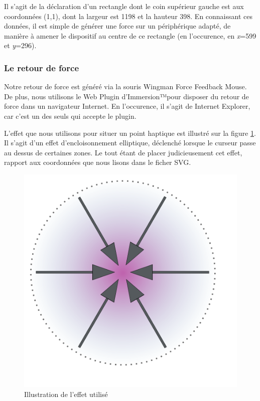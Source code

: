 \documentclass[
]{book}
\begin{document}
Il s'agit de la déclaration d'un rectangle dont le coin supérieur gauche
est aux coordonnées (1,1), dont la largeur est 1198 et la hauteur 398. En
connaissant ces données, il est simple de générer une force sur un
périphérique adapté, de manière à amener le dispositif au centre de ce
rectangle (en l'occurence, en \emph{x}=599 et \emph{y}=296).

\hypertarget{le-retour-de-force}{%
\subsubsection{Le retour de force}\label{le-retour-de-force}}

Notre retour de force est généré via la souris Wingman Force Feedback
Mouse. De plus, nous utilisons le Web Plugin d'Immersion™pour disposer du
retour de force dans un navigateur Internet. En l'occurence, il s'agit de
Internet Explorer, car c'est un des seuls qui accepte le plugin.

L'effet que nous utilisons pour situer un point haptique est illustré sur
la figure \ref{fig:aimant}. Il s'agit d'un
effet d'encloisonnement elliptique, déclenché lorsque le curseur passe au
dessus de certaines zones. Le tout étant de placer judicieusement cet effet,
rapport aux coordonnées que nous lisons dans le ficher SVG.

\begin{figure}
\centering
\includegraphics{img/aimant.svg}
\caption{\label{fig:aimant}Illustration de l'effet utilisé}
\end{figure}
\end{document}
